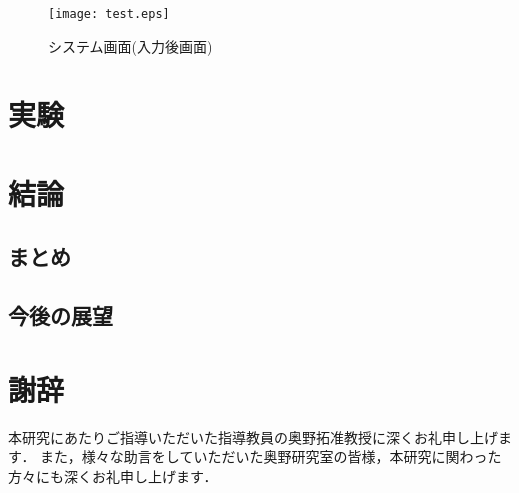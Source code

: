 \documentclass{funthesis}
\begin{document}
\newpage

\begin{figure}[!p]
  \begin{center}
    \texttt{[image: test.eps]}
    \caption{システム画面(入力後画面)}
  \end{center}
\end{figure}

\chapter{実験}

\chapter{結論}

\section{まとめ}

\section{今後の展望}

\chapter *{謝辞}
本研究にあたりご指導いただいた指導教員の奥野拓准教授に深くお礼申し上げます．
また，様々な助言をしていただいた奥野研究室の皆様，本研究に関わった方々にも深くお礼申し上げます．



\begin{thebibliography}{7}
\end{thebibliography}

\listoftables

\listoffigures
\end{document}

